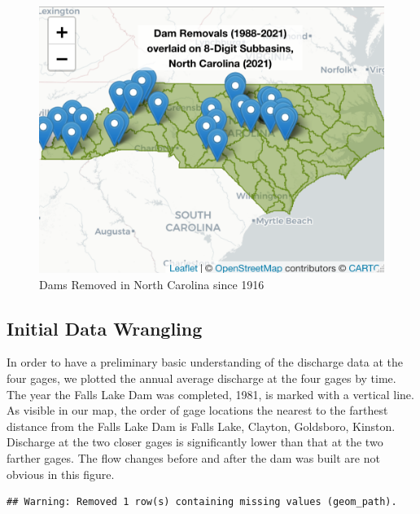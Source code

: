 \documentclass[
  12pt,
]{article}
\begin{document}
\begin{figure}
\centering
\includegraphics{"./Output/dam.removal.map.png"}
\caption{Dams Removed in North Carolina since 1916}
\end{figure}

\hypertarget{initial-data-wrangling}{%
\subsection{Initial Data Wrangling}\label{initial-data-wrangling}}

In order to have a preliminary basic understanding of the discharge data
at the four gages, we plotted the annual average discharge at the four
gages by time. The year the Falls Lake Dam was completed, 1981, is
marked with a vertical line. As visible in our map, the order of gage
locations the nearest to the farthest distance from the Falls Lake Dam
is Falls Lake, Clayton, Goldsboro, Kinston. Discharge at the two closer
gages is significantly lower than that at the two farther gages. The
flow changes before and after the dam was built are not obvious in this
figure.

\begin{verbatim}
## Warning: Removed 1 row(s) containing missing values (geom_path).
\end{verbatim}
\end{document}
